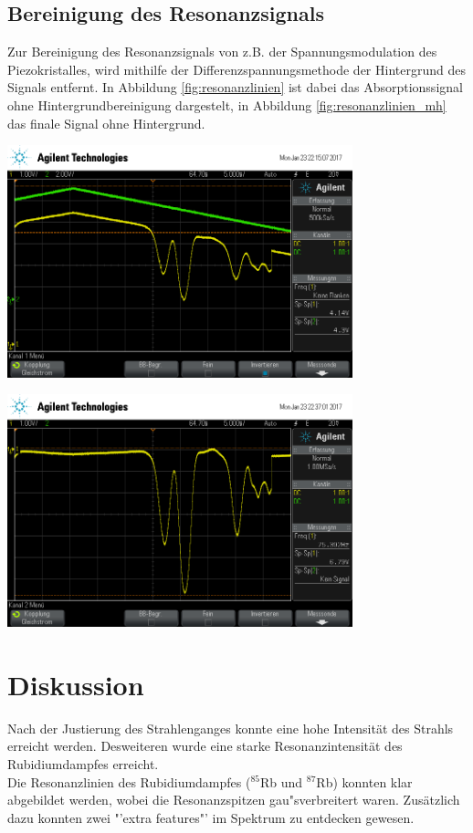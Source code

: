 \documentclass[captions=tableheading]{scrartcl}
\let\oldsection\section
\renewcommand\section{\clearpage\oldsection}
\begin{document}
\subsection{Bereinigung des Resonanzsignals}
Zur Bereinigung des Resonanzsignals von z.B. der Spannungsmodulation des Piezokristalles, wird mithilfe der Differenzspannungsmethode der Hintergrund des Signals entfernt. In Abbildung \ref{fig:resonanzlinien} ist dabei das Absorptionssignal ohne Hintergrundbereinigung dargestelt, in Abbildung \ref{fig:resonanzlinien_mh} das finale Signal ohne Hintergrund.
\begin{center}
	\includegraphics[width=10cm]{images/resonanz.png}
	\label{fig:resonanzlinien}
\end{center}

\begin{center}
	\includegraphics[width=10cm]{images/resonanz_bereinigt.png}
	\label{fig:resonanzlinien_mh}
	\end{center}

\section{Diskussion}
Nach der Justierung des Strahlenganges konnte eine hohe Intensität des Strahls erreicht werden. Desweiteren wurde eine starke Resonanzintensität des Rubidiumdampfes erreicht. \\
Die Resonanzlinien des Rubidiumdampfes ($^{85}$Rb und $^{87}$Rb) konnten klar abgebildet werden, wobei die Resonanzspitzen gau"sverbreitert waren. Zusätzlich dazu konnten zwei "'extra features"' im Spektrum zu entdecken gewesen. \\
\end{document}
